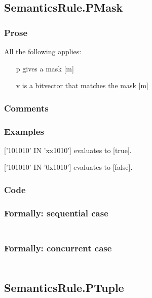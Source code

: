 \documentclass{book}
\begin{document}
\subsection{SemanticsRule.PMask \label{sec:SemanticsRule.PMask}}

    \subsubsection{Prose}
    All the following applies:
    \begin{itemize}
    \item [p] gives a mask [m]
    \item [v] is a bitvector that matches the mask [m]
    \end{itemize}

    \subsubsection{Comments}

    \subsubsection{Examples}
    ['101010' IN 'xx1010'] evaluates to [true].

    ['101010' IN '0x1010'] evaluates to [false].

  \subsubsection{Code}

  \subsubsection{Formally: sequential case}
  \begin{align}
  \end{align} 

  \subsubsection{Formally: concurrent case}
  \begin{align}
  \end{align} 

\subsection{SemanticsRule.PTuple \label{sec:SemanticsRule.}}
\end{document}
